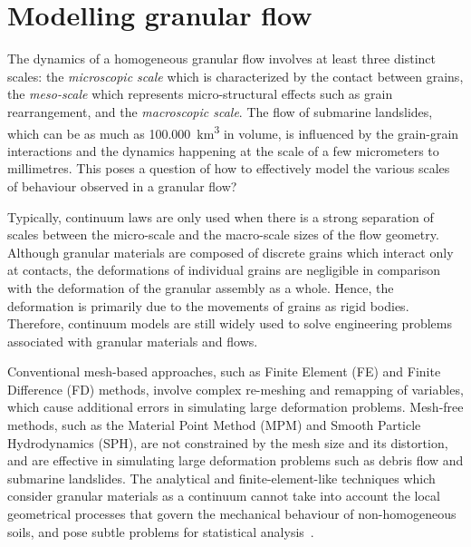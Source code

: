 \section{Modelling granular flow}

The dynamics of a homogeneous granular flow involves at least three distinct 
scales: the \textit{microscopic scale} which is characterized by the contact 
between grains, the \textit{meso-scale} which represents micro-structural 
effects such as grain rearrangement, and the \textit{macroscopic scale}. The 
flow of submarine landslides, which can be as much as \SI{100,000}{\km\cubed} 
in volume, is 
influenced by the grain-grain interactions and the dynamics happening at the 
scale of a few micrometers to millimetres. This poses a question of how to 
effectively model the various scales of behaviour observed in a granular 
flow?

Typically, continuum laws are only used when there is a strong separation of 
scales between the micro-scale and the macro-scale sizes of the flow geometry. 
Although granular materials are composed of discrete grains which interact only 
at contacts, the deformations of individual grains are negligible in comparison 
with the deformation of the granular assembly as a whole. Hence, the 
deformation is primarily due to the movements of grains as rigid bodies. 
Therefore, continuum models are still widely used to solve engineering problems 
associated with granular materials and flows. 

Conventional mesh-based approaches, such as Finite Element (FE) and Finite 
Difference (FD) methods, involve complex re-meshing and remapping of variables, 
which cause additional errors in simulating large deformation problems. 
Mesh-free methods, such as the Material Point Method (MPM) and Smooth Particle 
Hydrodynamics (SPH), are not constrained by the mesh size and its distortion, 
and are effective in simulating large deformation problems such as debris 
flow and submarine landslides. The analytical and finite-element-like 
techniques which consider granular materials as a continuum cannot take into 
account the local geometrical processes that govern the mechanical behaviour of 
non-homogeneous soils, and pose subtle problems for statistical 
analysis~\citep{Mehta1994}. 

